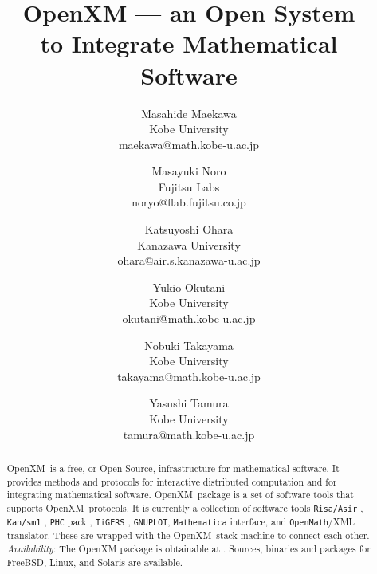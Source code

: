 \documentclass[notitlepage]{book}
\def\OpenXM{{\rm OpenXM\ }}
\begin{document}
\title{OpenXM 
      --- an Open System \\ to Integrate Mathematical Software}
\author{{Masahide Maekawa}\\
         {Kobe University}\\
         {maekawa@math.kobe-u.ac.jp}\\
         \and
         {Masayuki Noro}\\
         {Fujitsu Labs}\\
         {noryo@flab.fujitsu.co.jp}
         \and
         {Katsuyoshi Ohara}\\
         {Kanazawa University}\\
         {ohara@air.s.kanazawa-u.ac.jp}
         \and
         {Yukio Okutani}\\
         {Kobe University}\\
         {okutani@math.kobe-u.ac.jp}
         \and
         {Nobuki Takayama}\\
         {Kobe University}\\
         {takayama@math.kobe-u.ac.jp}
         \and
         {Yasushi Tamura}\\
         {Kobe University}\\
         {tamura@math.kobe-u.ac.jp}
       }
\maketitle

\begin{abstract}
\OpenXM is a free, or Open Source, infrastructure for mathematical
software.
It provides methods and protocols 
for interactive distributed computation and
for integrating mathematical software.
\OpenXM package is a set of software tools that supports \OpenXM protocols.
It is currently a collection of software tools
{\tt Risa/Asir} \cite{asir}, {\tt Kan/sm1} \cite{kan},
{\tt PHC} pack \cite{phc}, {\tt TiGERS} \cite{tigers},
{\tt GNUPLOT},
{\tt Mathematica} interface, and
{\tt OpenMath}/XML \cite{OpenMath} translator.
These are wrapped with the \OpenXM stack machine
to connect each other.
{\it Availability}: The OpenXM package is obtainable at \cite{openxm-web}.
Sources, binaries and packages for FreeBSD, Linux, and Solaris
are available.
\end{abstract}





















\end{document}
